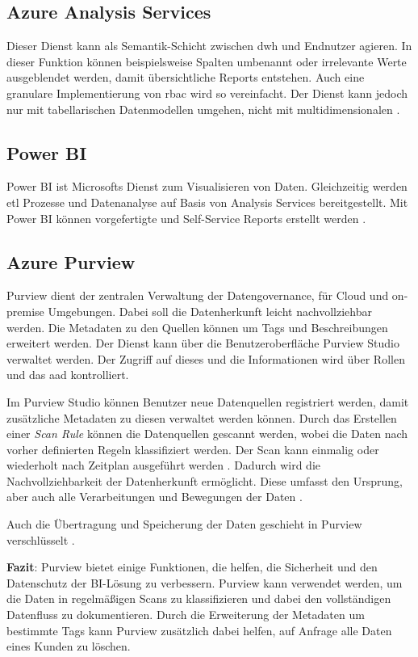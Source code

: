 \subsection{Azure Analysis Services} \label{sec:grundlagen:azure_dienste:analysisServices}
Dieser Dienst kann als Semantik-Schicht zwischen \ac{dwh} und Endnutzer agieren. In dieser Funktion können beispielsweise Spalten umbenannt oder irrelevante Werte ausgeblendet werden, damit übersichtliche Reports entstehen. Auch eine granulare Implementierung von \ac{rbac} wird so vereinfacht. Der Dienst kann jedoch nur mit tabellarischen Datenmodellen umgehen, nicht mit multidimensionalen \cite{how_beyond_2020}.

\subsection{Power BI} \label{sec:grundlagen:azure_dienste:powerBI}
Power BI ist Microsofts Dienst zum Visualisieren von Daten. Gleichzeitig werden \ac{etl} Prozesse und Datenanalyse auf Basis von Analysis Services bereitgestellt. Mit Power BI können vorgefertigte und Self-Service Reports erstellt werden \cite{how_beyond_2020}.

\subsection{Azure Purview} \label{sec:grundlagen:azure_dienste:purview}
Purview dient der zentralen Verwaltung der Datengovernance, für Cloud und on-premise Umgebungen. Dabei soll die Datenherkunft leicht nachvollziehbar werden. Die Metadaten zu den Quellen können um Tags und Beschreibungen erweitert werden. Der Dienst kann über die Benutzeroberfläche Purview Studio verwaltet werden. Der Zugriff auf dieses und die Informationen wird über Rollen und das \ac{aad} kontrolliert.

Im Purview Studio können Benutzer neue Datenquellen registriert werden, damit zusätzliche Metadaten zu diesen verwaltet werden können. Durch das Erstellen einer \textit{Scan Rule} können die Datenquellen gescannt werden, wobei die Daten nach vorher definierten Regeln klassifiziert werden. Der Scan kann einmalig oder wiederholt nach Zeitplan ausgeführt werden \cite{lesteve_definitive_2021}. Dadurch wird die Nachvollziehbarkeit der Datenherkunft ermöglicht. Diese umfasst den Ursprung, aber auch alle Verarbeitungen und Bewegungen der Daten \cite{riscutia_data_2021}.

Auch die Übertragung und Speicherung der Daten geschieht in Purview verschlüsselt \cite{baldwin_azure_2021}. 

\textbf{Fazit}: Purview bietet einige Funktionen, die helfen, die Sicherheit und den Datenschutz der BI-Lösung zu verbessern. Purview kann verwendet werden, um die Daten in regelmäßigen Scans zu klassifizieren und dabei den vollständigen Datenfluss zu dokumentieren. Durch die Erweiterung der Metadaten um bestimmte Tags kann Purview zusätzlich dabei helfen, auf Anfrage alle Daten eines Kunden zu löschen.